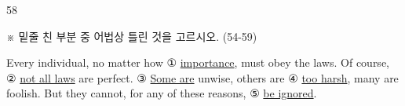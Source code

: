 \begin{question}{58}
\begin{framedtext}
※ 밑줄 친 부분 중 어법상 틀린 것을 고르시오. (54-59) \par
\end{framedtext}
Every individual, no matter how ① \uline{importance}, must obey the laws. Of course, ② \uline{not all laws} are perfect. ③ \uline{Some are} unwise, others are ④ \uline{too harsh}, many are foolish. But they cannot, for any of these reasons, ⑤ \uline{be ignored}.
\end{question}
